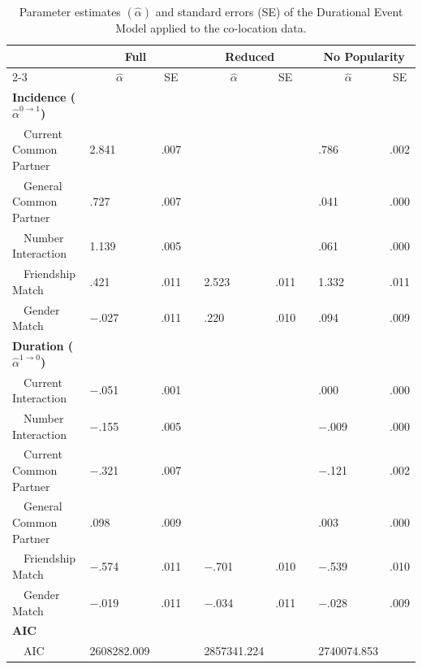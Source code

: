\begin{table}[t!]
\caption{Parameter estimates $(\hat{\alpha})$ and standard errors (SE) of the Durational Event Model applied to the co-location data.\label{tbl:results_gof_proximity}} 
\begin{center}
\begin{tabular}{lllcllcll}
\hline
\multicolumn{1}{l}{\bfseries }&\multicolumn{2}{c}{\bfseries Full}&\multicolumn{1}{l}{\bfseries }&\multicolumn{2}{c}{\bfseries Reduced}&\multicolumn{1}{l}{\bfseries }&\multicolumn{2}{c}{\bfseries No Popularity}\tabularnewline
\cline{2-3} \cline{5-6} \cline{8-9}
\multicolumn{1}{l}{}&\multicolumn{1}{c}{$\hat{\alpha}$}&\multicolumn{1}{c}{SE}&\multicolumn{1}{c}{}&\multicolumn{1}{c}{$\hat{\alpha}$}&\multicolumn{1}{c}{SE}&\multicolumn{1}{c}{}&\multicolumn{1}{c}{$\hat{\alpha}$}&\multicolumn{1}{c}{SE}\tabularnewline
\hline
{\bfseries Incidence ($\hat \alpha^{0\rightarrow 1}$)}&&&&&&&&\tabularnewline
~~Current Common Partner&2.841&.007&&&&&.786&.002\tabularnewline
~~General Common Partner&.727&.007&&&&&.041&.000\tabularnewline
~~Number Interaction&1.139&.005&&&&&.061&.000\tabularnewline
~~Friendship Match&.421&.011&&2.523&.011&&1.332&.011\tabularnewline
~~Gender Match&$-$.027&.011&&.220&.010&&.094&.009\tabularnewline
\hline
{\bfseries Duration ($\hat \alpha^{1\rightarrow 0}$)}&&&&&&&&\tabularnewline
~~Current Interaction&$-$.051&.001&&&&&.000&.000\tabularnewline
~~Number Interaction&$-$.155&.005&&&&&$-$.009&.000\tabularnewline
~~Current Common Partner&$-$.321&.007&&&&&$-$.121&.002\tabularnewline
~~General Common Partner&.098&.009&&&&&.003&.000\tabularnewline
~~Friendship Match&$-$.574&.011&&$-$.701&.010&&$-$.539&.010\tabularnewline
~~Gender Match&$-$.019&.011&&$-$.034&.011&&$-$.028&.009\tabularnewline
\hline
{\bfseries AIC}&&&&&&&&\tabularnewline
~~AIC&2608282.009&&&2857341.224&&&2740074.853&\tabularnewline
\hline
\end{tabular}\end{center}
\end{table}
